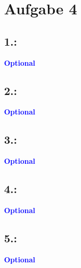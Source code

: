 \documentclass[a4paper,11pt]{scrartcl}
\newcommand{\opt}{\textcolor{blue}{\textbf{Optional}}}
\begin{document}
\section*{Aufgabe 4}
	\subsection*{1.:}
	\opt
	\subsection*{2.:}
	\opt
	\subsection*{3.:}
	\opt
	\subsection*{4.:}
	\opt
	\subsection*{5.:}
	\opt
\end{document}
